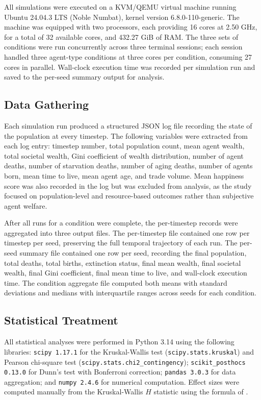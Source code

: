 \documentclass{icsthesis}
\begin{document}
\begin{mainmatter}
			All simulations were executed on a KVM/QEMU virtual machine running Ubuntu 24.04.3 LTS (Noble Numbat), kernel version 6.8.0-110-generic. The machine was equipped with two processors, each providing 16 cores at 2.50 GHz, for a total of 32 available cores, and 432.27 GiB of RAM. The three sets of conditions were run concurrently across three terminal sessions; each session handled three agent-type conditions at three cores per condition, consuming 27 cores in parallel. Wall-clock execution time was recorded per simulation run and saved to the per-seed summary output for analysis.

			\subsection{Data Gathering}
			Each simulation run produced a structured JSON log file recording the state of the population at every timestep. The following variables were extracted from each log entry: timestep number, total population count, mean agent wealth, total societal wealth, Gini coefficient of wealth distribution, number of agent deaths, number of starvation deaths, number of aging deaths, number of agents born, mean time to live, mean agent age, and trade volume. Mean happiness score was also recorded in the log but was excluded from analysis, as the study focused on population-level and resource-based outcomes rather than subjective agent welfare.

			After all runs for a condition were complete, the per-timestep records were aggregated into three output files. The per-timestep file contained one row per timestep per seed, preserving the full temporal trajectory of each run. The per-seed summary file contained one row per seed, recording the final population, total deaths, total births, extinction status, final mean wealth, final societal wealth, final Gini coefficient, final mean time to live, and wall-clock execution time. The condition aggregate file computed both means with standard deviations and medians with interquartile ranges across seeds for each condition.

			\subsection{Statistical Treatment}
			All statistical analyses were performed in Python 3.14 using the following libraries: \texttt{scipy 1.17.1} \citep{Virtanen2020} for the Kruskal-Wallis test (\texttt{scipy.stats.kruskal}) and Pearson chi-square test (\texttt{scipy.stats.chi2\_contingency}); \texttt{scikit\_posthocs 0.13.0} \citep{Terpilowski2019} for Dunn's test with Bonferroni correction; \texttt{pandas 3.0.3} for data aggregation; and \texttt{numpy 2.4.6}  for numerical computation. Effect sizes were computed manually from the Kruskal-Wallis $H$ statistic using the formula of \citet{Tomczak2014}.


\end{mainmatter}
\end{document}

